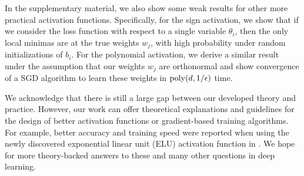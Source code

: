 %
In the supplementary material, we also show some weak results for other more practical activation functions. Specifically, for the sign activation, we show that if we consider the loss function with respect to a single variable $\theta_i$, then the only local minimas are at the true weights $w_j$, with high probability under random initializations of $b_i$. For the polynomial activation, we derive a similar result under the assumption that our weights $w_j$ are orthonormal and show convergence of a SGD algorithm to learn these weights in $\mathrm{poly}(d,1/\epsilon)$ time.
%


We acknowledge that there is still a large gap between our developed theory and practice. However, our work can offer theoretical explanations and guidelines for the design of better activation functions or gradient-based training algorithms. For example, better accuracy and training speed were reported when using the newly discovered exponential linear unit (ELU) activation function in \cite{ClevertUH15, ShahKSS16}. We hope for more theory-backed answers to these and many other questions in deep learning.



